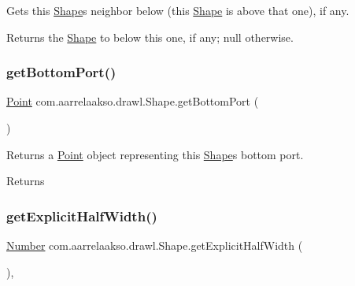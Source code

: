 Gets this \hyperlink{classcom_1_1aarrelaakso_1_1drawl_1_1_shape}{Shape}\textquotesingle{}s neighbor below (this \hyperlink{classcom_1_1aarrelaakso_1_1drawl_1_1_shape}{Shape} is above that one), if any. 

\begin{DoxyReturn}{Returns}
the \hyperlink{classcom_1_1aarrelaakso_1_1drawl_1_1_shape}{Shape} to below this one, if any; {\ttfamily null} otherwise. 
\end{DoxyReturn}
\mbox{\label{classcom_1_1aarrelaakso_1_1drawl_1_1_shape_aba14efe9a16c0808580963c66b171082}} 
\subsubsection{\texorpdfstring{get\+Bottom\+Port()}{getBottomPort()}}
{\footnotesize\ttfamily \hyperlink{classcom_1_1aarrelaakso_1_1drawl_1_1_point}{Point} com.\+aarrelaakso.\+drawl.\+Shape.\+get\+Bottom\+Port (\begin{DoxyParamCaption}{ }\end{DoxyParamCaption})\hspace{0.3cm}{\ttfamily [inherited]}}



Returns a \hyperlink{classcom_1_1aarrelaakso_1_1drawl_1_1_point}{Point} object representing this \hyperlink{classcom_1_1aarrelaakso_1_1drawl_1_1_shape}{Shape}\textquotesingle{}s bottom port. 

\begin{DoxyReturn}{Returns}

\end{DoxyReturn}
\mbox{\label{classcom_1_1aarrelaakso_1_1drawl_1_1_shape_a3acdc2fd1944e2efacd0bfbb8aefe89b}} 
\subsubsection{\texorpdfstring{get\+Explicit\+Half\+Width()}{getExplicitHalfWidth()}}
{\footnotesize\ttfamily \hyperlink{interfacecom_1_1aarrelaakso_1_1drawl_1_1_number}{Number} com.\+aarrelaakso.\+drawl.\+Shape.\+get\+Explicit\+Half\+Width (\begin{DoxyParamCaption}{ }\end{DoxyParamCaption})\hspace{0.3cm}{\ttfamily [protected]}, {\ttfamily [inherited]}}



